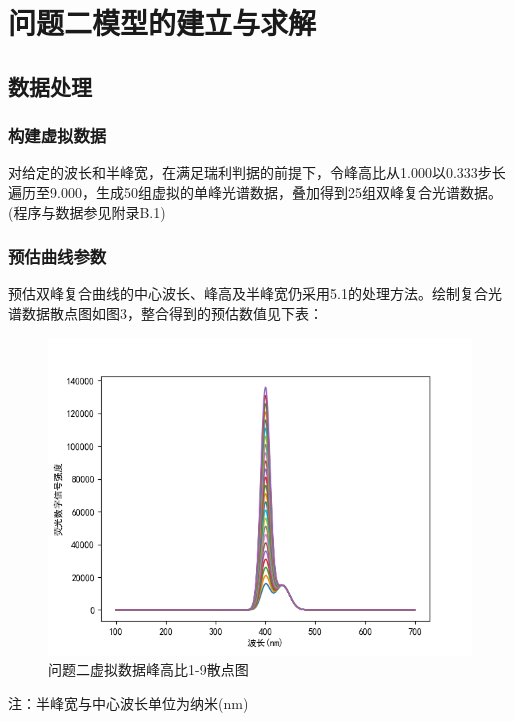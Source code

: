 \documentclass{article}
\numberwithin{equation}{subsection}
\begin{document}
{\centering\section{问题二模型的建立与求解}}

\subsection{数据处理}
\subsubsection{构建虚拟数据}
对给定的波长和半峰宽，在满足瑞利判据的前提下，令峰高比从1.000以0.333步长遍历至9.000，生成50组虚拟的单峰光谱数据，叠加得到25组双峰复合光谱数据。(程序与数据参见附录B.1)

\subsubsection{预估曲线参数}
预估双峰复合曲线的中心波长、峰高及半峰宽仍采用5.1的处理方法。绘制复合光谱数据散点图如图3，整合得到的预估数值见下表：
\begin{figure}[H]
    \centering
    \includegraphics[scale=0.6]{峰高比1_to_9作图.png}
    \caption{问题二虚拟数据峰高比1-9散点图}
    \label{问题二虚拟数据峰高比1-9散点图}
\end{figure}
\newpage
注：半峰宽与中心波长单位为纳米(nm)
\end{document}
